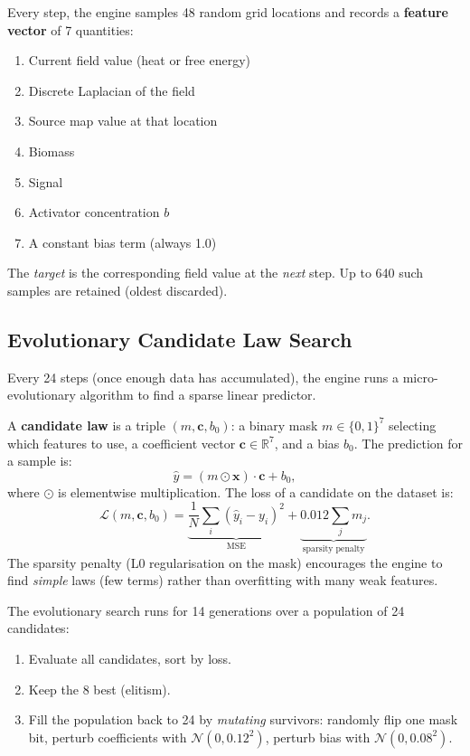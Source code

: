 \documentclass[12pt,a4paper]{article}
\newcommand{\RR}{\mathbb{R}}
\newcommand{\vv}[1]{\mathbf{#1}}
\begin{document}
Every step, the engine samples 48 random grid locations
and records a \textbf{feature vector} of 7 quantities:
\begin{enumerate}[nosep]
  \item Current field value (heat or free energy)
  \item Discrete Laplacian of the field
  \item Source map value at that location
  \item Biomass
  \item Signal
  \item Activator concentration $b$
  \item A constant bias term (always 1.0)
\end{enumerate}
The \emph{target} is the corresponding field value at the
\emph{next} step.
Up to 640 such samples are retained (oldest discarded).

\subsection{Evolutionary Candidate Law Search}

Every 24 steps (once enough data has accumulated),
the engine runs a micro-evolutionary algorithm to find
a sparse linear predictor.

A \textbf{candidate law} is a triple $(m, \vv{c}, b_0)$:
a binary mask $m \in \{0,1\}^7$ selecting which features to use,
a coefficient vector $\vv{c} \in \RR^7$, and a bias $b_0$.
The prediction for a sample is:
\[
  \hat{y} = (m \odot \vv{x}) \cdot \vv{c} + b_0,
\]
where $\odot$ is elementwise multiplication.
The loss of a candidate on the dataset is:
\[
  \mathcal{L}(m, \vv{c}, b_0) =
    \underbrace{\frac{1}{N}\sum_i (\hat{y}_i - y_i)^2}_{\text{MSE}}
    + \underbrace{0.012 \sum_j m_j}_{\text{sparsity penalty}}.
\]
The sparsity penalty (L0 regularisation on the mask)
encourages the engine to find \emph{simple} laws
(few terms) rather than overfitting with many weak features.

The evolutionary search runs for 14 generations over
a population of 24 candidates:
\begin{enumerate}[nosep]
  \item Evaluate all candidates, sort by loss.
  \item Keep the 8 best (elitism).
  \item Fill the population back to 24 by
    \emph{mutating} survivors:
    randomly flip one mask bit, perturb coefficients with
    $\mathcal{N}(0, 0.12^2)$, perturb bias with $\mathcal{N}(0, 0.08^2)$.
\end{enumerate}
\end{document}
